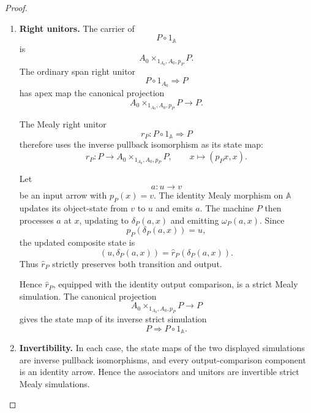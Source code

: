 \begin{proof}
\begin{enumerate}
        \item \textbf{Right unitors.}
        The carrier of
        \[
            P\circ1_{\mathbb A}
        \]
        is
        \[
            A_0\times_{1_{A_0},A_0,p_P}P.
        \]
        The ordinary span right unitor
        \[
            P\circ1_{A_0}\Longrightarrow P
        \]
        has apex map the canonical projection
        \[
            A_0\times_{1_{A_0},A_0,p_P}P\to P.
        \]

        The Mealy right unitor
        \[
            r_P:
            P\circ1_{\mathbb A}
            \Rightarrow
            P
        \]
        therefore uses the inverse pullback isomorphism as its state map:
        \[
            \widehat r_P:
            P\longrightarrow
            A_0\times_{1_{A_0},A_0,p_P}P,
            \qquad
            x\longmapsto(p_Px,x).
        \]

        Let
        \[
            a:u\to v
        \]
        be an input arrow with \(p_P(x)=v\). The identity Mealy morphism on
        \(\mathbb A\) updates its object-state from \(v\) to \(u\) and emits
        \(a\). The machine \(P\) then processes \(a\) at \(x\), updating to
        \(\delta_P(a,x)\) and emitting \(\omega_P(a,x)\). Since
        \[
            p_P(\delta_P(a,x))=u,
        \]
        the updated composite state is
        \[
            (u,\delta_P(a,x))
            =
            \widehat r_P(\delta_P(a,x)).
        \]
        Thus \(\widehat r_P\) strictly preserves both transition and output.

        Hence \(\widehat r_P\), equipped with the identity output comparison,
        is a strict Mealy simulation. The canonical projection
        \[
            A_0\times_{1_{A_0},A_0,p_P}P\to P
        \]
        gives the state map of its inverse strict simulation
        \[
            P\Rightarrow P\circ1_{\mathbb A}.
        \]

        \item \textbf{Invertibility.}
        In each case, the state maps of the two displayed simulations are
        inverse pullback isomorphisms, and every output-comparison component is
        an identity arrow. Hence the associators and unitors are invertible
        strict Mealy simulations.
    \end{enumerate}
\end{proof}

